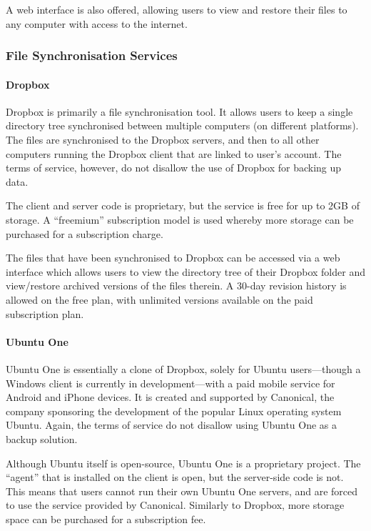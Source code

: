 \begin{bibunit}[plain]
A web interface is also offered, allowing users to view and restore their files
to any computer with access to the internet.

\subsubsection{File Synchronisation Services}

\paragraph{Dropbox}

Dropbox is primarily a file synchronisation tool. It allows users to keep
a single directory tree synchronised between multiple computers (on different
platforms). The files are synchronised to the Dropbox servers, and then to all
other computers running the Dropbox client that are linked to user's account.
The terms of service, however, do not disallow the use of Dropbox for backing
up data.

The client and server code is proprietary, but the service is free for up to
2GB of storage. A ``freemium'' subscription model is used whereby more storage
can be purchased for a subscription charge.

The files that have been synchronised to Dropbox can be accessed via a web
interface which allows users to view the directory tree of their Dropbox folder
and view/restore archived versions of the files therein. A 30-day revision
history is allowed on the free plan, with unlimited versions available on the
paid subscription plan.

\paragraph{Ubuntu One}

Ubuntu One is essentially a clone of Dropbox, solely for Ubuntu users---though
a Windows client is currently in development---with a paid mobile service for
Android and iPhone devices. It is created and supported by Canonical, the
company sponsoring the development of the popular Linux operating system
Ubuntu. Again, the terms of service do not disallow using Ubuntu One as
a backup solution.

Although Ubuntu itself is open-source, Ubuntu One is a proprietary project. The
``agent'' that is installed on the client is open, but the server-side code is
not. This means that users cannot run their own Ubuntu One servers, and are
forced to use the service provided by Canonical. Similarly to Dropbox, more storage space can
be purchased for a subscription fee.


\end{bibunit}
